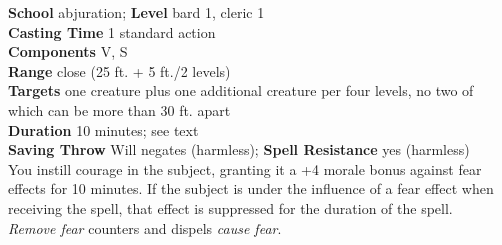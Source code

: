 \textbf{School} abjuration; \textbf{Level} bard 1, cleric 1\\
\textbf{Casting Time} 1 standard action\\
\textbf{Components} V, S\\
\textbf{Range} close (25 ft. + 5 ft./2 levels)\\
\textbf{Targets} one creature plus one additional creature per four levels, no two of which can be more than 30 ft. apart\\
\textbf{Duration} 10 minutes; see text\\
\textbf{Saving Throw }Will negates (harmless); \textbf{Spell Resistance} yes (harmless)\\
You instill courage in the subject, granting it a +4 morale bonus against fear effects for 10 minutes. If the subject is under the influence of a fear effect when receiving the spell, that effect is suppressed for the duration of the spell.\\
\textit{Remove fear} counters and dispels \textit{cause fear}.\\
